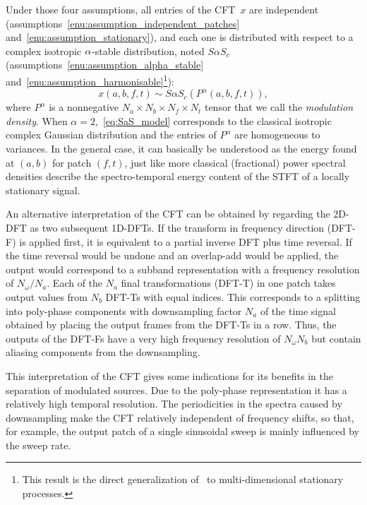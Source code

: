 Under those four assumptions, all entries of the CFT~$x$ are independent
(assumptions~\ref{enu:assumption_independent_patches} and~\ref{enu:assumption_stationary}),
and each one is distributed with respect to a complex isotropic $\text{\ensuremath{\alpha}}$-stable
distribution, noted $S\alpha S_{c}$ (assumptions~\ref{enu:assumption_alpha_stable}
and~\ref{enu:assumption_harmonisable}\footnote{This result is the direct generalization
of~\cite[th. 6.5.1]{samoradnitsky1994stable} to multi-dimensional stationary processes.}):
\begin{equation}
x\left(a,b,f,t\right)\sim S\alpha S_{c}\left(P^{\alpha}\left(a,b,f,t\right)\right),\label{eq:SaS_model}
\end{equation}
where $P^{\alpha}$ is a nonnegative $N_{a}\times N_{b}\times N_{f}\times N_{t}$
tensor that we call the \emph{modulation density}. When $\alpha=2$,~\eqref{eq:SaS_model}
corresponds to the classical isotropic complex Gaussian distribution
and the entries of $P^{\alpha}$ are homogeneous to variances. In
the general case, it can basically be understood as the energy found at $\left(a,b\right)$ for patch
$\left(f,t\right)$, just like more classical (fractional) power spectral
densities describe the spectro-temporal energy content of the STFT
of a locally stationary signal.

%

An alternative interpretation of the CFT can be obtained by regarding the 2D-DFT
as two subsequent 1D-DFTs. If the transform in frequency direction (DFT-F) is
applied first, it is equivalent to a partial inverse DFT plus time reversal. If
the time reversal would be undone and an overlap-add would be applied, the
output would correspond to a subband representation with a frequency resolution
of $N_\omega / N_a$. Each of the $N_a$ final transformations (DFT-T) in one
patch takes output values from $N_b$ DFT-Ts with equal indices. This corresponds
to a splitting into poly-phase components with downsampling factor $N_a$ of the
time signal obtained by placing the output frames from the DFT-Ts in a row.
Thus, the outputs of the DFT-Fs have a very high frequency resolution of
$N_\omega N_b$ but contain aliasing components from the downsampling.

This interpretation of the CFT gives some indications for its benefits in the
separation of modulated sources. Due to the poly-phase representation it has a
relatively high temporal resolution. The periodicities in the spectra caused
by downsampling make the CFT relatively independent of frequency shifts, so
that, for example, the output patch of a single sinusoidal sweep is mainly
influenced by the sweep rate.

